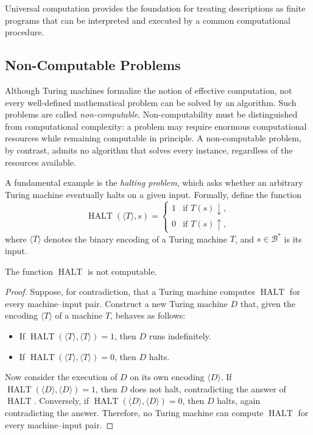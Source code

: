 Universal computation provides the foundation for treating descriptions as finite programs that can be interpreted and executed by a common computational procedure.


\subsection*{Non-Computable Problems}

Although Turing machines formalize the notion of effective computation, not every well-defined mathematical problem can be solved by an algorithm. Such problems are called \emph{non-computable}. Non-computability must be distinguished from computational complexity: a problem may require enormous computational resources while remaining computable in principle. A non-computable problem, by contrast, admits no algorithm that solves every instance, regardless of the resources available.

A fundamental example is the \emph{halting problem}, which asks whether an arbitrary Turing machine eventually halts on a given input. Formally, define the function
\[
\operatorname{HALT}(\langle T\rangle,s)=
\begin{cases}
1 & \text{if } T(s)\downarrow,\\
0 & \text{if } T(s)\uparrow,
\end{cases}
\]
where $\langle T\rangle$ denotes the binary encoding of a Turing machine $T$, and $s\in\mathcal{B}^\ast$ is its input.

\begin{proposition}
\label{th:halting-problem}
The function $\operatorname{HALT}$ is not computable.
\end{proposition}

\begin{proof}
Suppose, for contradiction, that a Turing machine computes $\operatorname{HALT}$ for every machine--input pair. Construct a new Turing machine $D$ that, given the encoding $\langle T\rangle$ of a machine $T$, behaves as follows:

\begin{itemize}
    \item If $\operatorname{HALT}(\langle T\rangle,\langle T\rangle)=1$, then $D$ runs indefinitely.
    \item If $\operatorname{HALT}(\langle T\rangle,\langle T\rangle)=0$, then $D$ halts.
\end{itemize}

Now consider the execution of $D$ on its own encoding $\langle D\rangle$. If $\operatorname{HALT}(\langle D\rangle,\langle D\rangle)=1$, then $D$ does not halt, contradicting the answer of $\operatorname{HALT}$. Conversely, if $\operatorname{HALT}(\langle D\rangle,\langle D\rangle)=0$, then $D$ halts, again contradicting the answer. Therefore, no Turing machine can compute $\operatorname{HALT}$ for every machine--input pair.
\end{proof}

